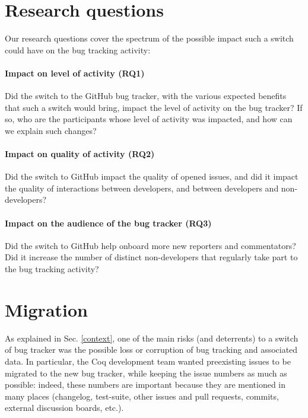 \documentclass[conference]{IEEEtran}
\begin{document}
\section{Research questions}

\label{research_questions}

Our research questions cover the spectrum of the possible impact such a switch could have on the bug tracking activity:

\paragraph{Impact on level of %
activity (RQ1)}

Did the switch to the GitHub bug tracker, with the various expected benefits that such a switch would bring, impact the level of activity on the bug tracker? If so, who are the participants whose level of activity was impacted, and how can we explain such changes?

\paragraph{Impact on quality of %
activity (RQ2)}

Did the switch to GitHub impact the quality of opened issues, and did it impact the quality of interactions between developers, and between developers and non-developers?

\paragraph{Impact on the audience of the bug tracker (RQ3)}

Did the switch to GitHub help onboard more new reporters and commentators? Did it increase the number of distinct non-developers that regularly take part to the bug tracking activity?

\section{Migration}
\label{migration}

As explained in Sec. \ref{context}, one of the main risks (and deterrents) to a switch of bug tracker was the possible loss or corruption of bug tracking and associated data. In particular, the Coq development team wanted preexisting issues to be migrated to the new bug tracker, while keeping the issue numbers as much as possible: indeed, these numbers are important because they are mentioned in many places (changelog, test-suite, other issues and pull requests, commits, external discussion boards, etc.).
\end{document}
